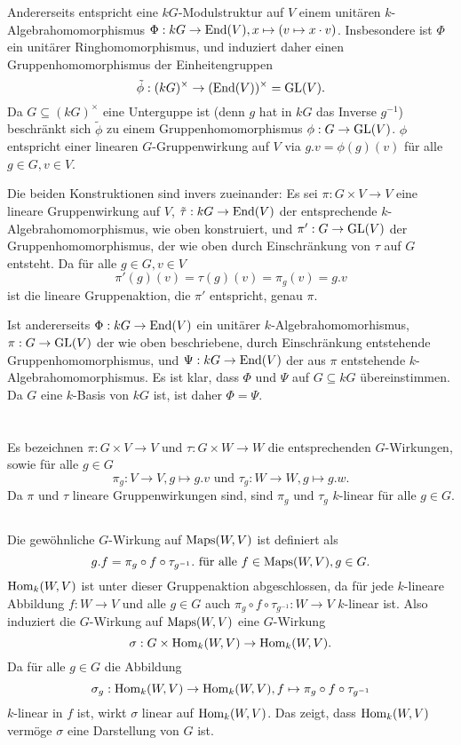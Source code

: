 \documentclass[a4paper,10pt]{article}
\begin{document}
Andererseits entspricht eine $kG$-Modulstruktur auf $V$ einem unitären $k$-Algebra\-homo\-morphismus $\Phi : kG \to \operatorname{End}(V), x \mapsto (v \mapsto x \cdot v)$. Insbesondere ist $\Phi$ ein unitärer Ringhomomorphismus, und induziert daher einen Gruppenhomomorphismus der Einheitengruppen
\[
 \tilde{\phi} : (kG)^\times \to (\operatorname{End}(V))^\times = \operatorname{GL}(V).
\]
Da $G \subseteq (kG)^\times$ eine Unterguppe ist (denn $g$ hat in $kG$ das Inverse $g^{-1}$) beschränkt sich $\tilde{\phi}$ zu einem Gruppenhomomorphismus $\phi : G \to \operatorname{GL}(V)$. $\phi$ entspricht einer linearen $G$-Gruppenwirkung auf $V$ via $g.v = \phi(g)(v)$ für alle $g \in G, v \in V$.

Die beiden Konstruktionen sind invers zueinander: Es sei $\pi : G \times V \to V$ eine lineare Gruppenwirkung auf $V$, $\tilde{\tau} : kG \to \operatorname{End}(V)$ der entsprechende $k$-Algebra\-homo\-morphismus, wie oben konstruiert, und $\pi' : G \to \operatorname{GL}(V)$ der Gruppenhomomorphismus, der wie oben durch Einschränkung von $\tau$ auf $G$ entsteht. Da für alle $g \in G, v \in V$
\[
 \pi'(g)(v) = \tau(g)(v) = \pi_g(v) = g.v
\]
ist die lineare Gruppenaktion, die $\pi'$ entspricht, genau $\pi$.

Ist andererseits $\Phi : kG \to \operatorname{End}(V)$ ein unitärer $k$-Algebra\-homo\-morhismus, $\pi : G \to \operatorname{GL}(V)$ der wie oben beschriebene, durch Einschränkung entstehende Gruppenhomomorphismus, und $\Psi : kG \to \operatorname{End}(V)$ der aus $\pi$ entstehende $k$-Algebra\-homo\-morphismus. Es ist klar, dass $\Phi$ und $\Psi$ auf $G \subseteq kG$ übereinstimmen. Da $G$ eine $k$-Basis von $kG$ ist, ist daher $\Phi = \Psi$.





\section{}
Es bezeichnen $\pi : G \times V \to V$ und $\tau : G \times W \to W$ die entsprechenden $G$-Wirkungen, sowie für alle $g \in G$
\[
 \pi_g : V \to V, g \mapsto g.v \text{ und }
 \tau_g : W \to W, g \mapsto g.w.
\]
Da $\pi$ und $\tau$ lineare Gruppenwirkungen sind, sind $\pi_g$ und $\tau_g$ $k$-linear für alle $g \in G$.


\subsection{}
Die gewöhnliche $G$-Wirkung auf $\operatorname{Maps}(W,V)$ ist definiert als
\[
 g.f = \pi_g \circ f \circ \tau_{g^{-1}}. \text{ für alle } f \in \operatorname{Maps}(W,V), g \in G.
\]
$\operatorname{Hom}_k(W,V)$ ist unter dieser Gruppenaktion abgeschlossen, da für jede $k$-lineare Abbildung $f : W \to V$ und alle $g \in G$ auch $\pi_g \circ f \circ \tau_{g^{-1}} : W \to V$ $k$-linear ist. Also induziert die $G$-Wirkung auf $\operatorname{Maps}(W,V)$ eine $G$-Wirkung
\[
 \sigma : G \times \operatorname{Hom}_k(W,V) \to \operatorname{Hom}_k(W,V).
\]
Da für alle $g \in G$ die Abbildung
\[
 \sigma_g : \operatorname{Hom}_k(W,V) \to \operatorname{Hom}_k(W,V), f \mapsto \pi_g \circ f \circ \tau_{g^{-1}}
\]
$k$-linear in $f$ ist, wirkt $\sigma$ linear auf $\operatorname{Hom}_k(W,V)$. Das zeigt, dass $\operatorname{Hom}_k(W,V)$ vermöge $\sigma$ eine Darstellung von $G$ ist.
\end{document}
